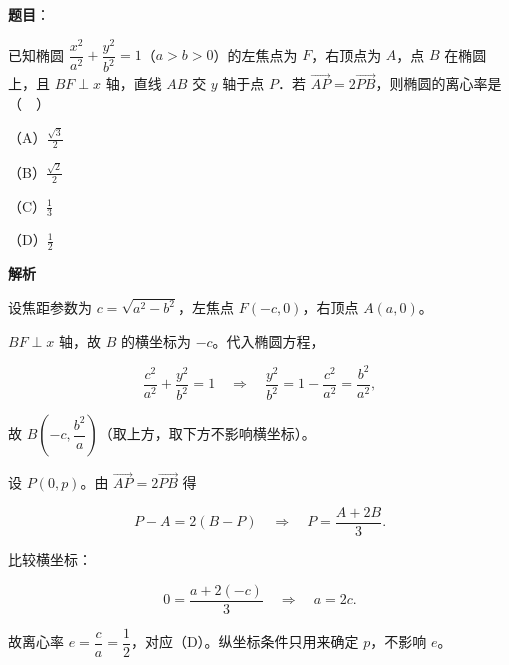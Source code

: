 \begin{answer}

\textbf{题目}：

已知椭圆 $\dfrac{x^2}{a^2}+\dfrac{y^2}{b^2}=1$（$a>b>0$）的左焦点为 $F$，右顶点为 $A$，点 $B$ 在椭圆上，且 $BF\perp x$ 轴，直线 $AB$ 交 $y$ 轴于点 $P$．若 $\overrightarrow{AP}=2\overrightarrow{PB}$，则椭圆的离心率是（　）

（A）$\frac{\sqrt3}{2}$

（B）$\frac{\sqrt2}{2}$

（C）$\frac13$

（D）$\frac12$

\textbf{解析}

设焦距参数为 $c=\sqrt{a^2-b^2}$，左焦点 $F(-c,0)$，右顶点 $A(a,0)$。

$BF\perp x$ 轴，故 $B$ 的横坐标为 $-c$。代入椭圆方程，

\nopagebreak[4]
\[\frac{c^2}{a^2}+\frac{y^2}{b^2}=1
\quad\Longrightarrow\quad
\frac{y^2}{b^2}=1-\frac{c^2}{a^2}=\frac{b^2}{a^2},\]

故 $B\left(-c,\dfrac{b^2}{a}\right)$（取上方，取下方不影响横坐标）。

设 $P(0,p)$。由 $\overrightarrow{AP}=2\overrightarrow{PB}$ 得

\nopagebreak[4]
\[P-A=2(B-P)\quad\Longrightarrow\quad P=\frac{A+2B}{3}.\]

比较横坐标：

\nopagebreak[4]
\[0=\frac{a+2(-c)}3\quad\Longrightarrow\quad a=2c.\]

故离心率 $e=\dfrac ca=\dfrac12$，对应（D）。纵坐标条件只用来确定 $p$，不影响 $e$。


\end{answer}
